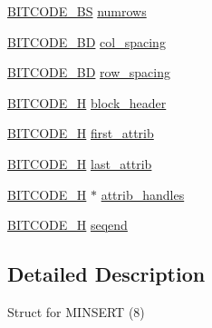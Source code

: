 \begin{DoxyCompactItemize}
\item 
\hyperlink{dwg_8h_a94297606fbd4a4ff97e8add284af0809}{\-B\-I\-T\-C\-O\-D\-E\-\_\-\-B\-S} \hyperlink{struct__dwg__entity__MINSERT_aa4c005e9bddc22a00782f74fbdc03f77}{numrows}
\item 
\hyperlink{dwg_8h_a3c1e6781466b74ba07785d57da70ed97}{\-B\-I\-T\-C\-O\-D\-E\-\_\-\-B\-D} \hyperlink{struct__dwg__entity__MINSERT_ad773cbbd225892b28d2e5c402c77216f}{col\-\_\-spacing}
\item 
\hyperlink{dwg_8h_a3c1e6781466b74ba07785d57da70ed97}{\-B\-I\-T\-C\-O\-D\-E\-\_\-\-B\-D} \hyperlink{struct__dwg__entity__MINSERT_aec06dc9f20a2b757f375268ffc3cfd1e}{row\-\_\-spacing}
\item 
\hyperlink{dwg_8h_a7c700e94e047a97ba8c24bdfe4029dc3}{\-B\-I\-T\-C\-O\-D\-E\-\_\-\-H} \hyperlink{struct__dwg__entity__MINSERT_a03aa3c78f397de0de808dce26a350b42}{block\-\_\-header}
\item 
\hyperlink{dwg_8h_a7c700e94e047a97ba8c24bdfe4029dc3}{\-B\-I\-T\-C\-O\-D\-E\-\_\-\-H} \hyperlink{struct__dwg__entity__MINSERT_a75c594e1bd34761bbb47c8c8507f0c7d}{first\-\_\-attrib}
\item 
\hyperlink{dwg_8h_a7c700e94e047a97ba8c24bdfe4029dc3}{\-B\-I\-T\-C\-O\-D\-E\-\_\-\-H} \hyperlink{struct__dwg__entity__MINSERT_a8a5b47583bf548d907faca8422cff8a9}{last\-\_\-attrib}
\item 
\hyperlink{dwg_8h_a7c700e94e047a97ba8c24bdfe4029dc3}{\-B\-I\-T\-C\-O\-D\-E\-\_\-\-H} $\ast$ \hyperlink{struct__dwg__entity__MINSERT_ac114e25adf33dfde6c32bc06435ec454}{attrib\-\_\-handles}
\item 
\hyperlink{dwg_8h_a7c700e94e047a97ba8c24bdfe4029dc3}{\-B\-I\-T\-C\-O\-D\-E\-\_\-\-H} \hyperlink{struct__dwg__entity__MINSERT_aa36fcef7fd9c9e7f7edc9a5bb763599c}{seqend}
\end{DoxyCompactItemize}


\subsection{\-Detailed \-Description}
\-Struct for \-M\-I\-N\-S\-E\-R\-T (8) 

